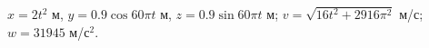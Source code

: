 $x = 2t^2$ м, $y = 0.9\cos{60\pi t}$ м, $z = 0.9 \sin{60\pi t}$ м;
$v = \sqrt{16t^2 + 2916\pi ^2}$ м/с; $w = 31945$ м/с$^2$.
